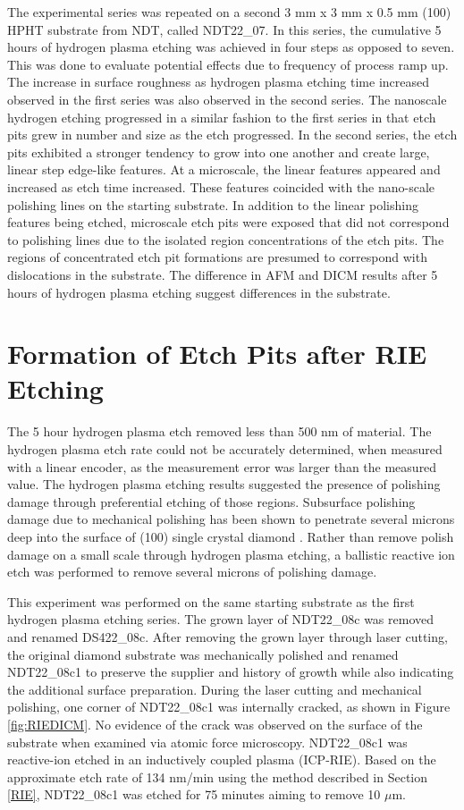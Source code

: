 The experimental series was repeated on a second 3 mm x 3 mm x 0.5 mm (100) HPHT substrate from NDT, called NDT22\_07. In this series, the cumulative 5 hours of hydrogen plasma etching was achieved in four steps as opposed to seven. This was done to evaluate potential effects due to frequency of process ramp up. The increase in surface roughness as hydrogen plasma etching time increased observed in the first series was also observed in the second series. The nanoscale hydrogen etching progressed in a similar fashion to the first series in that etch pits grew in number and size as the etch progressed. In the second series, the etch pits exhibited a stronger tendency to grow into one another and create large, linear step edge-like features. At a microscale, the linear features appeared and increased as etch time increased. These features coincided with the nano-scale polishing lines on the starting substrate. In addition to the linear polishing features being etched, microscale etch pits were exposed that did not correspond to polishing lines due to the isolated region concentrations of the etch pits. The regions of concentrated etch pit formations are presumed to correspond with dislocations in the substrate. The difference in AFM and DICM results after 5 hours of hydrogen plasma etching suggest differences in the substrate.

\section{Formation of Etch Pits after RIE Etching}
\indent

The 5 hour hydrogen plasma etch removed less than 500 nm of material. The hydrogen plasma etch rate could not be accurately determined, when measured with a linear encoder, as the measurement error was larger than the measured value. The hydrogen plasma etching results suggested the presence of polishing damage through preferential etching of those regions. Subsurface polishing damage due to mechanical polishing has been shown to penetrate several microns deep into the surface of (100) single crystal diamond \cite{Zheng2020SubsurfacePolishing}. Rather than remove polish damage on a small scale through hydrogen plasma etching, a ballistic reactive ion etch was performed to remove several microns of polishing damage.

This experiment was performed on the same starting substrate as the first hydrogen plasma etching series. The grown layer of NDT22\_08c was removed and renamed DS422\_08c. After removing the grown layer through laser cutting, the original diamond substrate was mechanically polished and renamed NDT22\_08c1 to preserve the supplier and history of growth while also indicating the additional surface preparation. During the laser cutting and mechanical polishing, one corner of NDT22\_08c1 was internally cracked, as shown in Figure \ref{fig:RIEDICM}. No evidence of the crack was observed on the surface of the substrate when examined via atomic force microscopy. NDT22\_08c1 was reactive-ion etched in an inductively coupled plasma (ICP-RIE). Based on the approximate etch rate of 134 nm/min using the method described in Section \ref{RIE}, NDT22\_08c1 was etched for 75 minutes aiming to remove 10 $\mu$m.

